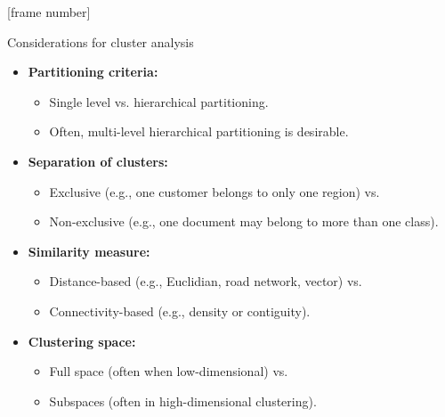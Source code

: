 \documentclass[aspectratio=169,t,xcolor=dvipsnames]{beamer}
\begin{document}
  {
    [frame number]
    \begin{frame}{Considerations for cluster analysis}
        \begin{itemize}
          \item \textbf{Partitioning criteria:}
          \begin{itemize}
            \item Single level vs. hierarchical partitioning.
            \item Often, multi-level hierarchical partitioning is desirable.
          \end{itemize}
          \item \textbf{Separation of clusters:}
          \begin{itemize}
            \item Exclusive (e.g., one customer belongs to only one region) vs.
            \item Non-exclusive (e.g., one document may belong to more than one class).
          \end{itemize}
          \item \textbf{Similarity measure:}
          \begin{itemize}
            \item Distance-based (e.g., Euclidian, road network, vector) vs.
            \item Connectivity-based (e.g., density or contiguity).
          \end{itemize}
          \item \textbf{Clustering space:}
          \begin{itemize}
            \item Full space (often when low-dimensional) vs.
            \item Subspaces (often in high-dimensional clustering).
          \end{itemize}
        \end{itemize}
    \end{frame}
  }
\end{document}
